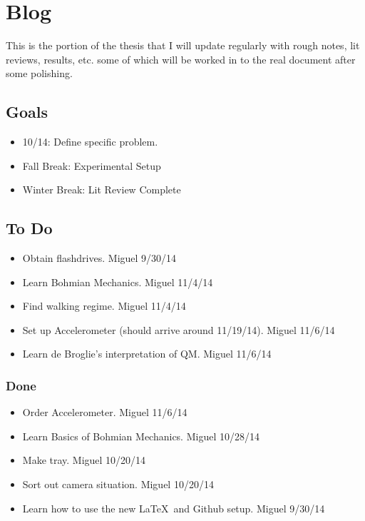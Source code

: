 \chapter*{Blog}
	
	This is the portion of the thesis that I will update regularly with rough notes, lit reviews, results, etc. some of which will be worked in to the real document after some polishing. 
	\section{Goals}
	\begin{itemize}
	\item{10/14: Define specific problem.}
	\item{Fall Break: Experimental Setup}
	\item{Winter Break: Lit Review Complete}

	\end{itemize}

	
	
	\section{To Do}
	\begin{itemize}
	\item{Obtain flashdrives.    Miguel 9/30/14}
    \item{Learn Bohmian Mechanics. Miguel 11/4/14}
    \item{Find walking regime. Miguel 11/4/14}
    \item{Set up Accelerometer (should arrive around 11/19/14). Miguel 
 11/6/14}
     \item{Learn de Broglie's interpretation of QM. Miguel 11/6/14}
	\end{itemize}
	
	\subsection{Done}
	\begin{itemize}
	\item{Order Accelerometer.    Miguel 11/6/14}
	\item{Learn Basics of Bohmian Mechanics. Miguel 10/28/14}
	\item{Make tray. Miguel 10/20/14}
	\item{Sort out camera situation. Miguel 10/20/14}
	\item{Learn how to use the new \LaTeX\ and Github setup. Miguel 9/30/14}
	\end{itemize}
	
